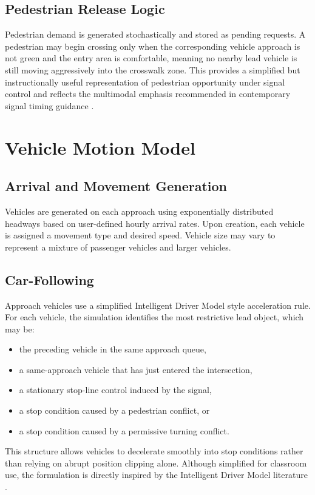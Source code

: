 \documentclass[conference]{IEEEtran}
\begin{document}
\subsection{Pedestrian Release Logic}
Pedestrian demand is generated stochastically and stored as pending requests. A pedestrian may begin crossing only when the corresponding vehicle approach is not green and the entry area is comfortable, meaning no nearby lead vehicle is still moving aggressively into the crosswalk zone. This provides a simplified but instructionally useful representation of pedestrian opportunity under signal control and reflects the multimodal emphasis recommended in contemporary signal timing guidance \cite{stm2015}.

\section{Vehicle Motion Model}
\subsection{Arrival and Movement Generation}
Vehicles are generated on each approach using exponentially distributed headways based on user-defined hourly arrival rates. Upon creation, each vehicle is assigned a movement type and desired speed. Vehicle size may vary to represent a mixture of passenger vehicles and larger vehicles.

\subsection{Car-Following}
Approach vehicles use a simplified Intelligent Driver Model style acceleration rule. For each vehicle, the simulation identifies the most restrictive lead object, which may be:
\begin{itemize}
\item the preceding vehicle in the same approach queue,
\item a same-approach vehicle that has just entered the intersection,
\item a stationary stop-line control induced by the signal,
\item a stop condition caused by a pedestrian conflict, or
\item a stop condition caused by a permissive turning conflict.
\end{itemize}

This structure allows vehicles to decelerate smoothly into stop conditions rather than relying on abrupt position clipping alone. Although simplified for classroom use, the formulation is directly inspired by the Intelligent Driver Model literature \cite{treiber2000}.
\end{document}
